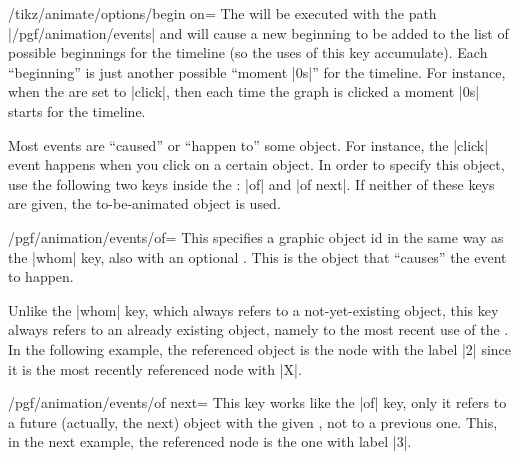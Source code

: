 \begin{key}{/tikz/animate/options/begin on=}
  The  will be executed with the path
  |/pgf/animation/events| and will cause a new beginning to be added
  to the list of possible beginnings for the timeline (so the uses of
  this key accumulate). Each ``beginning'' is just another possible
  ``moment |0s|'' for the timeline. For instance, when the
   are set to |click|, then each time the graph is
  clicked a moment |0s| starts for the timeline.

  Most events are ``caused'' or ``happen to'' some object. For
  instance, the |click| event happens when you click on a certain
  object. In order to specify this object, use the following two keys
  inside the : |of| and |of next|. If neither of these
  keys are given, the to-be-animated object is used.
  
  \begin{key}{/pgf/animation/events/of=}
    This specifies a graphic object id in the same way as the |whom|
    key, also with an optional . This is the object that
    ``causes'' the event to happen.

    Unlike the |whom| key, which always refers to a not-yet-existing
    object, this key always refers to an already existing
    object, namely to the most recent use of the . In the
    following example, the referenced object is the node with the
    label |2| since it is the most recently referenced node with
     |X|.
\begin{codeexample}[width=3cm]
\end{codeexample}
  \end{key}
  
  \begin{key}{/pgf/animation/events/of next=}
    This key works like the |of| key, only it refers to a future
    (actually, the next) object with the given , not to a
    previous one. This, in the next example, the referenced node is
    the one with label |3|.
\begin{codeexample}[width=3cm]
\end{codeexample}
  \end{key}


\end{key}
